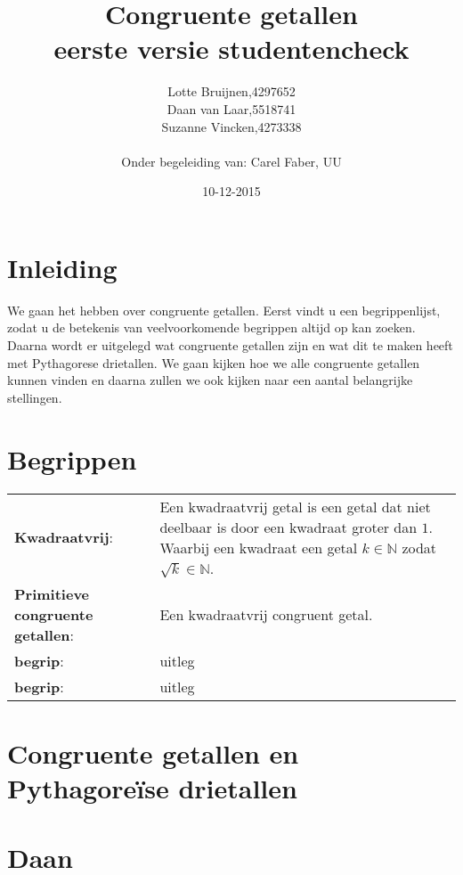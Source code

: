 \documentclass[12pt,reqno]{article}
\title{\textbf{Congruente getallen}\\
		\small{eerste versie studentencheck}}
\author{
	\begin{tabular}{ l l }
		Lotte Bruijnen, & 4297652 \\
		Daan van Laar, & 5518741 \\
		Suzanne Vincken, & 4273338
	\end{tabular}\\
	Onder begeleiding van: Carel Faber, UU
}
\date{10-12-2015}
\newcommand*{\NN}{\ensuremath{\mathbb{N}}}
\begin{document}
	
	\maketitle
	\allowdisplaybreaks
	
	\section{Inleiding}
	We gaan het hebben over congruente getallen. Eerst vindt u een begrippenlijst, zodat u de betekenis van veelvoorkomende begrippen altijd op kan zoeken. Daarna wordt er uitgelegd wat congruente getallen zijn en wat dit te maken heeft met Pythagorese drietallen. We gaan kijken hoe we alle congruente getallen kunnen vinden en daarna zullen we ook kijken naar een aantal belangrijke stellingen.
	
	
	\section{Begrippen}
	\begin{tabular}{ p{} p{10cm} }
		\textbf{Kwadraatvrij}: \cite{Beukers} & Een kwadraatvrij getal is een getal dat niet deelbaar is door een kwadraat groter dan $1$. Waarbij een kwadraat een getal $k\in\NN$ zodat $\sqrt{k}\in\NN$. \\
		\textbf{Primitieve congruente getallen}: & Een kwadraatvrij congruent getal. \\
		\textbf{begrip}: & uitleg \\
		\textbf{begrip}: & uitleg
	\end{tabular}
	
	\section{Congruente getallen en Pythagore\"{i}se drietallen}
	\section{Daan}
	
\end{document}
